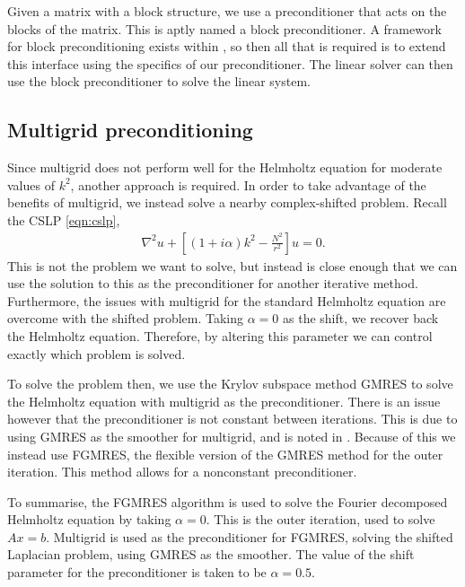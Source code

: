 Given a matrix with a block structure, we use a preconditioner that acts on the blocks of the matrix.
This is aptly named a block preconditioner.
A framework for block preconditioning exists within \oomph, so then all that is required is to extend this interface using the specifics of our preconditioner.
The linear solver can then use the block preconditioner to solve the linear system.


\subsection{Multigrid preconditioning}

Since multigrid does not perform well for the Helmholtz equation for moderate values of $k^2$, another approach is required.
In order to take advantage of the benefits of multigrid, we instead solve a nearby complex-shifted problem.
Recall the CSLP \eqref{eqn:cslp},
\begin{align}
	\nabla^2 u + \left[(1+i\alpha)k^2 - \frac{N^2}{r^2}\right] u = 0.
\end{align}
This is not the problem we want to solve, but instead is close enough that we can use the solution to this as the preconditioner for another iterative method.
Furthermore, the issues with multigrid for the standard Helmholtz equation are overcome with the shifted problem.
Taking $\alpha=0$ as the shift, we recover back the Helmholtz equation.
Therefore, by altering this parameter we can control exactly which problem is solved.

To solve the problem then, we use the Krylov subspace method GMRES to solve the Helmholtz equation with multigrid as the preconditioner.
There is an issue however that the preconditioner is not constant between iterations.
This is due to using GMRES as the smoother for multigrid, and is noted in \cite{elman}.
Because of this we instead use FGMRES, the flexible version of the GMRES method for the outer iteration.
This method allows for a nonconstant preconditioner.

To summarise, the FGMRES algorithm is used to solve the Fourier decomposed Helmholtz equation by taking $\alpha=0$.
This is the outer iteration, used to solve $Ax=b$.
Multigrid is used as the preconditioner for FGMRES, solving the shifted Laplacian problem, using GMRES as the smoother.
The value of the shift parameter for the preconditioner is taken to be $\alpha=0.5$.